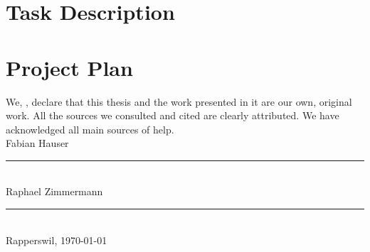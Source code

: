 \section{Task Description}\label{sec:task-description}

\section{Project Plan}\label{sec:project-plan}









\begin{declaration}
\addchaptertocentry{\authorshipname} %
\noindent We, \authorname, declare that this thesis and the work presented in it are our own, original work.  All the sources we consulted and cited are clearly attributed. We have acknowledged all main sources of help. \\

\noindent Fabian Hauser\\[2em]
\rule[0.5em]{25em}{0.5pt}\\ %
\noindent Raphael Zimmermann\\[2em]
\rule[0.5em]{25em}{0.5pt}\\ %
\noindent Rapperswil, \today
\end{declaration}

\cleardoublepage



  
